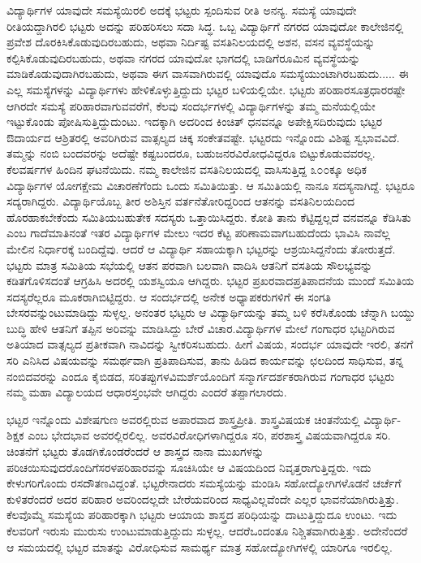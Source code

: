 {ವಿದ್ಯಾರ್ಥಿಗಳ ಯಾವುದೇ ಸಮಸ್ಯೆಯಿರಲಿ ಅದಕ್ಕೆ ಭಟ್ಟರು ಸ್ಪಂದಿಸುವ ರೀತಿ ಅನನ್ಯ. ಸಮಸ್ಯೆ ಯಾವುದೇ ರೀತಿಯದ್ದಾಗಿರಲಿ ಭಟ್ಟರು ಅದನ್ನು ಪರಿಹರಿಸಲು ಸದಾ ಸಿದ್ಧ. ಒಬ್ಬ ವಿದ್ಯಾರ್ಥಿಗೆ ನಗರದ ಯಾವುದೋ ಕಾಲೇಜಿನಲ್ಲಿ ಪ್ರವೇಶ ದೊರಕಿಸಿಕೊಡುವುದಿರಬಹುದು, ಅಥವಾ ನಿರ್ದಿಷ್ಟ ವಸತಿನಿಲಯದಲ್ಲಿ ಅಶನ, ವಸನ ವ್ಯವಸ್ಥೆಯನ್ನು ಕಲ್ಪಿಸಿಕೊಡುವುದಿರಬಹುದು, ಅಥವಾ ನಗರದ ಯಾವುದೋ ಭಾಗದಲ್ಲಿ ಬಾಡಿಗೆ\break ರೂಮಿನ ವ್ಯವಸ್ಥೆಯನ್ನು ಮಾಡಿಕೊಡುವುದಾಗಿರಬಹುದು, ಅಥವಾ ಈಗ ವಾಸವಾಗಿರುವಲ್ಲಿ  ಯಾವುದೊ ಸಮಸ್ಯೆಯುಂಟಾಗಿರಬಹುದು..... ಈ ಎಲ್ಲ ಸಮಸ್ಯೆಗಳನ್ನು ವಿದ್ಯಾರ್ಥಿಗಳು ಹೇಳಿಕೊಳ್ಳುತ್ತಿದ್ದುದು ಭಟ್ಟರ ಬಳಿಯಲ್ಲಿಯೇ. ಭಟ್ಟರು ಪರಿಹಾರ\break ಸೂತ್ರಧಾರರಷ್ಟೇ ಆಗಿರದೇ ಸಮಸ್ಯೆ ಪರಿಹಾರವಾಗುವವರೆಗೆ, ಕೆಲವು ಸಂದರ್ಭಗಳಲ್ಲಿ ವಿದ್ಯಾರ್ಥಿಗಳನ್ನು ತಮ್ಮ ಮನೆಯಲ್ಲಿಯೇ ಇಟ್ಟುಕೊಂಡು ಪೋಷಿಸುತ್ತಿದ್ದುದುಂಟು. ಇದಕ್ಕಾಗಿ ಅದರಿಂದ ಕಿಂಚಿತ್ ಧನವನ್ನೂ ಅಪೇಕ್ಷಿಸದಿರುವುದು ಭಟ್ಟರ ಔದಾರ್ಯದ ಆಶ್ರಿತರಲ್ಲಿ ಅವರಿಗಿರುವ ವಾತ್ಸಲ್ಯದ ಚಿಕ್ಕ ಸಂಕೇತವಷ್ಟೇ. ಭಟ್ಟರದು ಇನ್ನೊಂದು ವಿಶಿಷ್ಟ ಸ್ವಭಾವವಿದೆ. ತಮ್ಮನ್ನು ನಂಬಿ ಬಂದವರನ್ನು ಅದೆಷ್ಟೇ ಕಷ್ಟಬಂದರೂ, ಬಹುಜನರ\break  ವಿರೋಧವಿದ್ದರೂ ಬಿಟ್ಟುಕೊಡುವವರಲ್ಲ. ಕೆಲವರ್ಷಗಳ ಹಿಂದಿನ ಘಟನೆಯಿದು. ನಮ್ಮ ಕಾಲೇಜಿನ ವಸತಿನಿಲಯದಲ್ಲಿ ವಾಸಿಸುತ್ತಿದ್ದ ೩೦೦ಕ್ಕೂ ಅಧಿಕ ವಿದ್ಯಾರ್ಥಿಗಳ ಯೋಗ\-ಕ್ಷೇಮ ವಿಚಾರಣೆಗೆಂದು ಒಂದು ಸಮಿತಿಯಿತ್ತು. ಆ ಸಮಿತಿಯಲ್ಲಿ ನಾನೂ ಸದಸ್ಯ\break ನಾಗಿದ್ದೆ. ಭಟ್ಟರೂ ಸದ್ಯರಾಗಿದ್ದರು. ವಿದ್ಯಾರ್ಥಿಯೊಬ್ಬ ತೀರ ಅಶಿಸ್ತಿನ ವರ್ತನೆ\break ತೋರಿದ್ದರಿಂದ ಆತನನ್ನು ವಸತಿನಿಲಯದಿಂದ ಹೊರಹಾಕಬೇಕೆಂದು ಸಮಿತಿಯ\break ಬಹುತೇಕ ಸದಸ್ಯರು ಒತ್ತಾಯಿಸಿದ್ದರು. ಕೋತಿ ತಾನು ಕೆಟ್ಟಿದ್ದಲ್ಲದೆ ವನವನ್ನೂ ಕೆಡಿಸಿತು ಎಂಬ ಗಾದೆಮಾತಿನಂತೆ ಇತರ ವಿದ್ಯಾರ್ಥಿಗಳ ಮೇಲು ಇದರ ಕೆಟ್ಟ ಪರಿಣಾಮವಾಗಬಹುದೆಂದು ಭಾವಿಸಿ ನಾವೆಲ್ಲ ಮೇಲಿನ ನಿರ್ಧಾರಕ್ಕೆ ಬಂದಿದ್ದೆವು. ಆದರೆ ಆ ವಿದ್ಯಾರ್ಥಿ ಸಹಾಯಕ್ಕಾಗಿ ಭಟ್ಟರನ್ನು ಆಶ್ರಯಿಸಿದ್ದನೆಂದು ತೋರುತ್ತದೆ. ಭಟ್ಟರು ಮಾತ್ರ ಸಮಿತಿಯ ಸಭೆಯಲ್ಲಿ ಆತನ ಪರವಾಗಿ ಬಲವಾಗಿ ವಾದಿಸಿ ಆತನಿಗೆ ವಸತಿಯ ಸೌಲಭ್ಯವನ್ನು ಕಡಿತಗೊಳಿಸದಂತೆ ಆಗ್ರಹಿಸಿ ಅದರಲ್ಲಿ ಯಶಸ್ವಿಯೂ ಆಗಿದ್ದರು. ಭಟ್ಟರ ಪ್ರಖರವಾದ\break ಪ್ರತಿಪಾದನೆಯ ಮುಂದೆ ಸಮಿತಿಯ ಸದಸ್ಯರೆಲ್ಲರೂ ಮೂಕರಾಗಿಬಿಟ್ಟಿದ್ದರು. ಆ ಸಂದರ್ಭದಲ್ಲಿ ಅನೇಕ ಅಧ್ಯಾಪಕರುಗಳಿಗೆ ಈ ಸಂಗತಿ ಬೇಸರವನ್ನುಂಟುಮಾಡಿದ್ದು \break ಸುಳ್ಳಲ್ಲ. ಅನಂತರ ಭಟ್ಟರು ಆ ವಿದ್ಯಾರ್ಥಿಯನ್ನು ತಮ್ಮ ಬಳಿ ಕರೆಸಿಕೊಂಡು ಚೆನ್ನಾಗಿ ಬಯ್ದು ಬುದ್ಧಿ ಹೇಳಿ ಆತನಿಗೆ ತಪ್ಪಿನ ಅರಿವನ್ನು ಮಾಡಿಸಿದ್ದು ಬೇರೆ ವಿಚಾರ.\break   ವಿದ್ಯಾರ್ಥಿಗಳ ಮೇಲೆ ಗಂಗಾಧರ ಭಟ್ಟರಿಗಿರುವ ಅತಿಯಾದ ವಾತ್ಸಲ್ಯದ ಪ್ರತೀಕವಾಗಿ ನಾವಿದನ್ನು ಸ್ವೀಕರಿಸಬಹುದು. ಹೀಗೆ ವಿಷಯ, ಸಂದರ್ಭ ಯಾವುದೇ ಇರಲಿ, ತನಗೆ ಸರಿ ಎನಿಸಿದ  ವಿಷಯವನ್ನು  ಸಮರ್ಥವಾಗಿ ಪ್ರತಿಪಾದಿಸುವ, ತಾನು ಹಿಡಿದ ಕಾರ್ಯವನ್ನು ಛಲದಿಂದ ಸಾಧಿಸುವ, ತನ್ನ ನಂಬಿದವರನ್ನು ಎಂದೂ ಕೈಬಿಡದ, ಸರಿತಪ್ಪುಗಳ\break  ವಿಮರ್ಶೆಯೊಂದಿಗೆ ಸನ್ಮಾರ್ಗದರ್ಶಕರಾಗಿರುವ ಗಂಗಾಧರ ಭಟ್ಟರು ನಮ್ಮ ಮಹಾ ವಿದ್ಯಾಲಯದ ಆಧಾರಸ್ತಂಭವೇ ಆಗಿದ್ದರು ಎಂದರೆ ತಪ್ಪಾಗಲಾರದು. 

ಭಟ್ಟರ ಇನ್ನೊಂದು ವಿಶೇಷಗುಣ ಅವರಲ್ಲಿರುವ ಅಪಾರವಾದ ಶಾಸ್ತ್ರಪ್ರೀತಿ. ಶಾಸ್ತ್ರವಿಷಯಕ ಚಿಂತನೆಯಲ್ಲಿ ವಿದ್ಯಾರ್ಥಿ-ಶಿಕ್ಷಕ ಎಂಬ ಭೇದಭಾವ ಅವರಲ್ಲಿರಲಿಲ್ಲ. ಅವರ\break ವಿರೋಧಿಗಳಾಗಿದ್ದರೂ ಸರಿ, ಪರಶಾಸ್ತ್ರ ವಿಷಯವಾಗಿದ್ದರೂ ಸರಿ. ಚಿಂತನೆಗೆ ಭಟ್ಟರು ತೊಡಗಿಕೊಂಡರೆಂದರೆ ಆ ಶಾಸ್ತ್ರದ ನಾನಾ ಮುಖಗಳನ್ನು ಪರಿಚಯಿಸುವುದರೊಂದಿಗೆ\break ಸರಳಪರಿಹಾರವನ್ನು ಸೂಚಿಸಿಯೇ ಆ ವಿಷಯದಿಂದ ನಿವೃತ್ತರಾಗುತ್ತಿದ್ದರು. ಇದು ಕೇಳುಗರಿಗೊಂದು ರಸದೌತಣವಿದ್ದಂತೆ. ಭಟ್ಟರೇನಾದರು ಸಮಸ್ಯೆಯನ್ನು ಮಂಡಿಸಿ ಸಹೋದ್ಯೋಗಿಗಳೊಡನೆ ಚರ್ಚೆಗೆ ಕುಳಿತರೆಂದರೆ ಅದರ ಪರಿಹಾರ ಅವರಿಂದಲ್ಲದೇ ಬೇರೆಯವರಿಂದ ಸಾಧ್ಯವಿಲ್ಲವೆಂದೇ ಎಲ್ಲರ ಭಾವನೆಯಾಗಿರುತ್ತಿತ್ತು. ಕೆಲವೊಮ್ಮೆ ಸಮಸ್ಯೆಯ ಪರಿಹಾರಕ್ಕಾಗಿ ಭಟ್ಟರು ಆಯಾಯ ಶಾಸ್ತ್ರದ ಪರಿಧಿಯನ್ನು ದಾಟುತ್ತಿದ್ದುದೂ ಉಂಟು. ಇದು ಕೆಲವರಿಗೆ ಇರುಸು\enginline{-} ಮುರುಸು ಉಂಟುಮಾಡುತ್ತಿದ್ದುದು ಸುಳ್ಳಲ್ಲ. ಆದರೆ\break ಒಂದಂತೂ ನಿಶ್ಚಿತವಾಗಿರುತ್ತಿತ್ತು. ಅದೇನೆಂದರೆ ಆ ಸಮಯದಲ್ಲಿ ಭಟ್ಟರ ಮಾತನ್ನು ವಿರೋಧಿಸುವ ಸಾಮರ್ಥ್ಯ ಮಾತ್ರ ಸಹೋದ್ಯೋಗಿಗಳಲ್ಲಿ ಯಾರಿಗೂ ಇರಲಿಲ್ಲ. 

}

